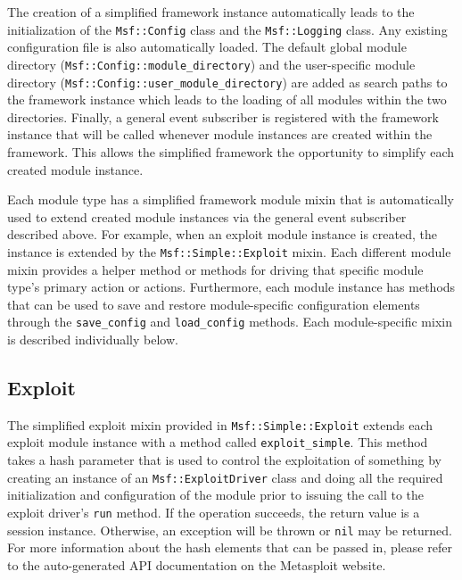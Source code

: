 \documentclass{report}
\begin{document}
\par
The creation of a simplified framework instance automatically leads
to the initialization of the \texttt{Msf::Config} class and the
\texttt{Msf::Logging} class.  Any existing configuration file is
also automatically loaded.  The default global module directory
(\texttt{Msf::Config::module\_directory}) and the user-specific
module directory (\texttt{Msf::Config::user\_module\_directory}) are
added as search paths to the framework instance which leads to the
loading of all modules within the two directories.  Finally, a
general event subscriber is registered with the framework instance
that will be called whenever module instances are created within the
framework.  This allows the simplified framework the opportunity to
simplify each created module instance.

\par
Each module type has a simplified framework module mixin that is
automatically used to extend created module instances via the
general event subscriber described above.  For example, when an
exploit module instance is created, the instance is extended by the
\texttt{Msf::Simple::Exploit} mixin.  Each different module mixin
provides a helper method or methods for driving that specific module
type's primary action or actions.  Furthermore, each module instance
has methods that can be used to save and restore module-specific
configuration elements through the \texttt{save\_config} and
\texttt{load\_config} methods.  Each module-specific mixin is
described individually below.

        \subsection{Exploit}

\par
The simplified exploit mixin provided in
\texttt{Msf::Simple::Exploit} extends each exploit module instance
with a method called \texttt{exploit\_simple}.  This method takes a
hash parameter that is used to control the exploitation of something
by creating an instance of an \texttt{Msf::ExploitDriver} class and
doing all the required initialization and configuration of the
module prior to issuing the call to the exploit driver's
\texttt{run} method.  If the operation succeeds, the return value is
a session instance.  Otherwise, an exception will be thrown or
\texttt{nil} may be returned. For more information about the hash
elements that can be passed in, please refer to the auto-generated
API documentation on the Metasploit website.
\end{document}
